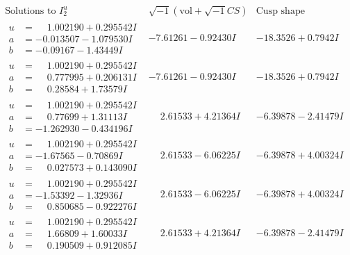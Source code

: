 \documentclass[1p]{elsarticle_modified}
\theoremstyle{definition}
\newcommand{\I}{\sqrt{-1}}
\begin{document}
$$\begin{array}{c|c|c}  
\text{Solutions to }I^u_{2}& \I (\text{vol} + \sqrt{-1}CS) & \text{Cusp shape}\\
 \hline 
\begin{aligned}
u &= \phantom{-}1.002190 + 0.295542 I \\
a &= -0.013507 - 1.079530 I \\
b &= -0.09167 - 1.43449 I\end{aligned}
 & -7.61261 - 0.92430 I & -18.3526 + 0.7942 I \\ \hline\begin{aligned}
u &= \phantom{-}1.002190 + 0.295542 I \\
a &= \phantom{-}0.777995 + 0.206131 I \\
b &= \phantom{-}0.28584 + 1.73579 I\end{aligned}
 & -7.61261 - 0.92430 I & -18.3526 + 0.7942 I \\ \hline\begin{aligned}
u &= \phantom{-}1.002190 + 0.295542 I \\
a &= \phantom{-}0.77699 + 1.31113 I \\
b &= -1.262930 - 0.434196 I\end{aligned}
 & \phantom{-}2.61533 + 4.21364 I & -6.39878 - 2.41479 I \\ \hline\begin{aligned}
u &= \phantom{-}1.002190 + 0.295542 I \\
a &= -1.67565 - 0.70869 I \\
b &= \phantom{-}0.027573 + 0.143090 I\end{aligned}
 & \phantom{-}2.61533 - 6.06225 I & -6.39878 + 4.00324 I \\ \hline\begin{aligned}
u &= \phantom{-}1.002190 + 0.295542 I \\
a &= -1.53392 - 1.32936 I \\
b &= \phantom{-}0.850685 - 0.922276 I\end{aligned}
 & \phantom{-}2.61533 - 6.06225 I & -6.39878 + 4.00324 I \\ \hline\begin{aligned}
u &= \phantom{-}1.002190 + 0.295542 I \\
a &= \phantom{-}1.66809 + 1.60033 I \\
b &= \phantom{-}0.190509 + 0.912085 I\end{aligned}
 & \phantom{-}2.61533 + 4.21364 I & -6.39878 - 2.41479 I \\ \hline\begin{aligned}

\end{aligned}
\end{array}$$
\end{document}
